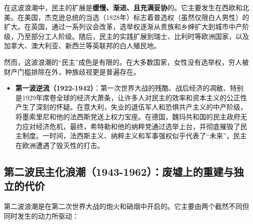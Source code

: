 在这波浪潮中，民主的扩展是\textbf{缓慢、渐进、且充满妥协}的。它主要发生在西欧和北美。在美国，杰克逊总统的当选（1828年）标志着普选权（虽然仅限白人男性）的扩大。在英国，通过一系列议会改革，选举权逐渐从贵族和乡绅扩大到城市中产阶级，乃至部分工人阶级。随后，民主的实践扩展到瑞士、比利时等欧洲国家，以及加拿大、澳大利亚、新西兰等英联邦的白人殖民地。

然而，这波浪潮的“民主”成色是有限的。在大多数国家，女性没有选举权，穷人被财产门槛排除在外，种族歧视更是普遍存在。

\begin{itemize}
    \item \textbf{第一波逆流（1922-1942）}：第一次世界大战的残酷、战后经济的凋敝、特别是1929年席卷全球的经济大萧条，让许多人对民主的效率和资本主义的公正性产生了深刻的怀疑。在意大利，失业的退伍军人和恐惧共产主义的中产阶级，将墨索里尼和他的法西斯党送上权力宝座。在德国，魏玛共和国的民主政府无力应对经济危机，最终，希特勒和他的纳粹党通过选举上台，并彻底摧毁了民主制度。一时间，法西斯主义、纳粹主义和军事强权似乎代表了“未来”，民主在欧洲遭遇了毁灭性的打击。
\end{itemize}

\subsection{第二波民主化浪潮（1943-1962）：废墟上的重建与独立的代价}

第二波浪潮是在第二次世界大战的炮火和硝烟中开启的。它主要由两个截然不同但同时发生的动力所驱动：

